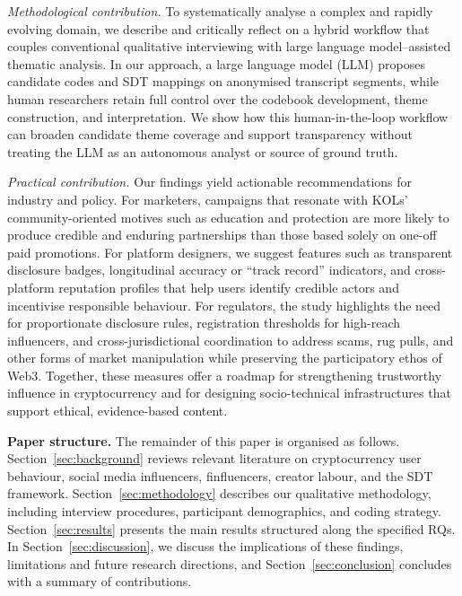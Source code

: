 \emph{Methodological contribution.} To systematically analyse a complex and rapidly evolving domain, we describe and critically reflect on a hybrid workflow that couples conventional qualitative interviewing with large language model--assisted thematic analysis. In our approach, a large language model (LLM) proposes candidate codes and SDT mappings on anonymised transcript segments, while human researchers retain full control over the codebook development, theme construction, and interpretation. We show how this human-in-the-loop workflow can broaden candidate theme coverage and support transparency without treating the LLM as an autonomous analyst or source of ground truth.

\emph{Practical contribution.}
Our findings yield actionable recommendations for industry and policy. For marketers, campaigns that resonate with KOLs' community-oriented motives such as education and protection are more likely to produce credible and enduring partnerships than those based solely on one-off paid promotions. For platform designers, we suggest features such as transparent disclosure badges, longitudinal accuracy or ``track record'' indicators, and cross-platform reputation profiles that help users identify credible actors and incentivise responsible behaviour. For regulators, the study highlights the need for proportionate disclosure rules, registration thresholds for high-reach influencers, and cross-jurisdictional coordination to address scams, rug pulls, and other forms of market manipulation while preserving the participatory ethos of Web3. Together, these measures offer a roadmap for strengthening trustworthy influence in cryptocurrency and for designing socio-technical infrastructures that support ethical, evidence-based content.

\noindent \textbf{Paper structure.} The remainder of this paper is organised as follows. Section~\ref{sec:background} reviews relevant literature on cryptocurrency user behaviour, social media influencers, finfluencers, creator labour, and the SDT framework. Section~\ref{sec:methodology} describes our qualitative methodology, including interview procedures, participant demographics, and coding strategy. Section~\ref{sec:results} presents the main results structured along the specified RQs. In Section~\ref{sec:discussion}, we discuss the implications of these findings, limitations and future research directions, and Section~\ref{sec:conclusion} concludes with a summary of contributions.

